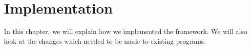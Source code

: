 
\chapter{Implementation}\label{chap:implementation} %
In this chapter, we will explain how we implemented the framework. We will also look at the changes which needed to be made to existing programs.




% 

